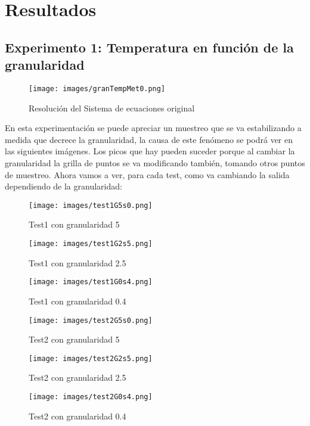 \documentclass[a4paper]{article}
\begin{document}
\section{Resultados}
\subsection{Experimento 1: Temperatura en función de la granularidad}
\begin{figure}[H]
\centering
\texttt{[image: images/granTempMet0.png]}
\caption{Resolución del Sistema de ecuaciones original}
\label{exp1plot}
\end{figure}

En esta experimentación se puede apreciar un muestreo que se va estabilizando a medida que decrece la granularidad, la causa de este fenómeno se podrá ver en las siguientes imágenes. Los picos que hay pueden suceder porque al cambiar la granularidad la grilla de puntos se va modificando también, tomando otros puntos de muestreo. Ahora vamos a ver, para cada test, como va cambiando la salida dependiendo de la granularidad:
\begin{figure}[H]
  \captionsetup{labelformat=empty}
	\begin{center}
		\texttt{[image: images/test1G5s0.png]}
		\caption{Test1 con granularidad 5}
		\label{fig:exp1-5}
	\end{center}
	\endminipage\hfill
	\begin{center}
		\texttt{[image: images/test1G2s5.png]}
		\caption{Test1 con granularidad 2.5}
		\label{fig:exp1-2}
	\end{center}
	\endminipage\hfill
  \begin{center}
    \texttt{[image: images/test1G0s4.png]}
    \caption{Test1 con granularidad 0.4}
    \label{fig:exp1-2}
  \end{center}
  \endminipage\hfill
\end{figure}
\begin{figure}[H]
  \captionsetup{labelformat=empty}
  \begin{center}
    \texttt{[image: images/test2G5s0.png]}
    \caption{Test2 con granularidad 5}
    \label{fig:exp1-5}
  \end{center}
  \endminipage\hfill
  \begin{center}
    \texttt{[image: images/test2G2s5.png]}
    \caption{Test2 con granularidad 2.5}
    \label{fig:exp1-2}
  \end{center}
  \endminipage\hfill
  \begin{center}
    \texttt{[image: images/test2G0s4.png]}
    \caption{Test2 con granularidad 0.4}
    \label{fig:exp1-2}
  \end{center}
  \endminipage\hfill
\end{figure}
\end{document}
